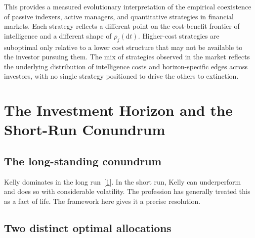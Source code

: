 \documentclass[11pt]{article}
\newcommand{\dd}{\mathrm{d}}
\begin{document}
This provides a measured evolutionary interpretation of the
empirical coexistence of passive indexers, active managers, and
quantitative strategies in financial markets. Each strategy reflects
a different point on the cost-benefit frontier of intelligence and a
different shape of $\rho_{j}(\dd t)$. Higher-cost strategies are
suboptimal only relative to a lower cost structure that may not be
available to the investor pursuing them. The mix of strategies
observed in the market reflects the underlying distribution of
intelligence costs and horizon-specific edges across investors,
with no single strategy positioned to drive the others to extinction.

\section{The Investment Horizon and the Short-Run Conundrum}

\subsection{The long-standing conundrum}

Kelly dominates in the long run~[\hyperlink{ref:1}{1}]. In the short run, Kelly can
underperform and does so with considerable volatility. The profession
has generally treated this as a fact of life. The framework here
gives it a precise resolution.

\subsection{Two distinct optimal allocations}
\end{document}
